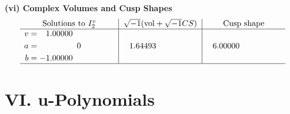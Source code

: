 \documentclass[1p]{elsarticle_modified}
\theoremstyle{definition}
\newcommand{\I}{\sqrt{-1}}
\begin{document}
\newpage\flushleft \textbf{(vi) Complex Volumes and Cusp Shapes}
$$\begin{array}{c|c|c}  
\text{Solutions to }I^v_{2}& \I (\text{vol} + \sqrt{-1}CS) & \text{Cusp shape}\\
 \hline 
\begin{aligned}
v &= \phantom{-}1.00000\phantom{ +0.000000I} \\
a &= \phantom{-0.000000 } 0 \\
b &= -1.00000\phantom{ +0.000000I}\end{aligned}
 & \phantom{-}1.64493\phantom{ +0.000000I} & \phantom{-}6.00000\phantom{ +0.000000I}\\
 \hline 
 \end{array}$$\newpage
\newpage\renewcommand{\arraystretch}{1}
\centering \section*{ VI. u-Polynomials}
\end{document}
